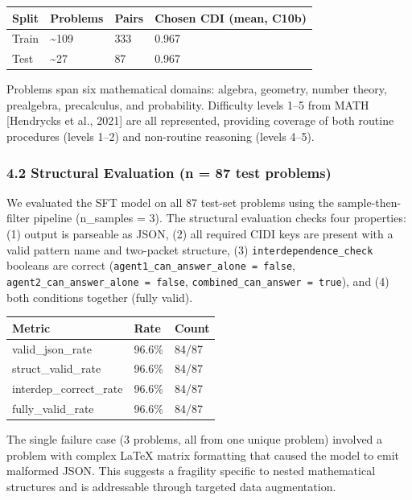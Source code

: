 \documentclass[
  11pt,
]{article}
\newcounter{none} %
\begin{document}
{\def\LTcaptype{none} %
\begin{longtable}[]{@{}llll@{}}
\toprule\noalign{}
Split & Problems & Pairs & Chosen CDI (mean, C10b) \\
\midrule\noalign{}
\endhead
\bottomrule\noalign{}
\endlastfoot
Train & \textasciitilde109 & 333 & 0.967 \\
Test & \textasciitilde27 & 87 & 0.967 \\
\end{longtable}
}

Problems span six mathematical domains: algebra, geometry, number
theory, prealgebra, precalculus, and probability. Difficulty levels 1--5
from MATH {[}Hendrycks et al., 2021{]} are all represented, providing
coverage of both routine procedures (levels 1--2) and non-routine
reasoning (levels 4--5).

\subsubsection{4.2 Structural Evaluation (n = 87 test
problems)}\label{structural-evaluation-n-87-test-problems}

We evaluated the SFT model on all 87 test-set problems using the
sample-then-filter pipeline (n\_samples = 3). The structural evaluation
checks four properties: (1) output is parseable as JSON, (2) all
required CIDI keys are present with a valid pattern name and two-packet
structure, (3) \texttt{interdependence\_check} booleans are correct
(\texttt{agent1\_can\_answer\_alone\ =\ false},
\texttt{agent2\_can\_answer\_alone\ =\ false},
\texttt{combined\_can\_answer\ =\ true}), and (4) both conditions
together (fully valid).

{\def\LTcaptype{none} %
\begin{longtable}[]{@{}lll@{}}
\toprule\noalign{}
Metric & Rate & Count \\
\midrule\noalign{}
\endhead
\bottomrule\noalign{}
\endlastfoot
valid\_json\_rate & 96.6\% & 84/87 \\
struct\_valid\_rate & 96.6\% & 84/87 \\
interdep\_correct\_rate & 96.6\% & 84/87 \\
fully\_valid\_rate & 96.6\% & 84/87 \\
\end{longtable}
}

The single failure case (3 problems, all from one unique problem)
involved a problem with complex LaTeX matrix formatting that caused the
model to emit malformed JSON. This suggests a fragility specific to
nested mathematical structures and is addressable through targeted data
augmentation.
\end{document}
